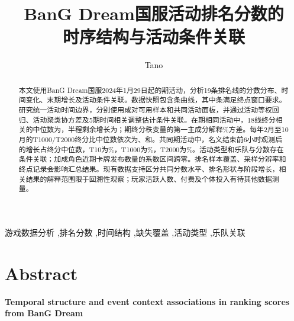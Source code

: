 \documentclass[preprint,12pt]{elsarticle}
\begin{document}
\begin{frontmatter}
\title{BanG Dream国服活动排名分数的\\时序结构与活动条件关联}
\author{Tano}
\begin{abstract}
本文使用BanG Dream国服2024年1月29日起的\NumEvents{}期活动，分析19条排名线的分数分布、时间变化、末期增长及活动条件关联。数据快照包含\NumSourceCurves{}条曲线，其中\NumValidCurves{}条满足终点窗口要求。研究统一活动时间边界，分别使用成对可用样本和共同活动面板，并通过活动等权回归、活动聚类协方差及5期时间相关调整估计条件关联。在\NumCorrelationEvents{}期相同活动中，18线终分相关的中位数为\RhoFinal{}，半程剩余增长为\RhoGrowth{}；\NumCoreEvents{}期终分秩变量的第一主成分解释\PcaFirst{}\%方差。每年2月至10月的T1000/T2000终分比中位数依次为\RatioYearFirst{}、\RatioYearSecond{}和\RatioYearThird{}。共同\RemainingEvents{}期活动中，名义结束前6小时观测后的增长占终分中位数，T10为\LateSixTop{}\%，T1000为\LateSixThousand{}\%，T2000为\LateSixTwoThousand{}\%。活动类型和乐队与分数存在条件关联；加成角色近期卡牌发布数量的系数区间跨零。排名样本覆盖、采样分辨率和终点记录会影响汇总结果。现有数据支持区分共同分数水平、排名形状与阶段增长，相关结果的解释范围限于回溯性观察；玩家活跃人数、付费及个体投入有待其他数据测量。
\end{abstract}
\begin{keyword}
游戏数据分析 \sep 排名分数 \sep 时间结构 \sep 缺失覆盖 \sep 活动类型 \sep 乐队关联
\end{keyword}
\end{frontmatter}

\section*{Abstract}
{\raggedright\noindent\textbf{Temporal structure and event context associations in ranking scores from BanG Dream}\par}
\end{document}
